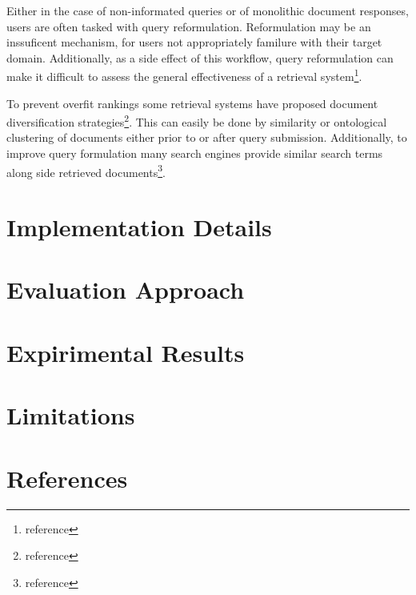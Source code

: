 \documentclass[10pt,twocolumn]{article} %
\begin{document}
Either in the case of non-informated queries or of monolithic document responses, users
are often tasked with query reformulation. Reformulation may be an inssuficent mechanism,
for users not appropriately familure with their target domain. Additionally, as
a side effect of this workflow, query reformulation can make it difficult to assess
the general effectiveness of a retrieval system\footnote{reference}.

To prevent overfit rankings some retrieval systems have proposed document diversification
strategies\footnote{reference}. This can easily be done by similarity or ontological
clustering of documents either prior to or after query submission. Additionally, to improve
query formulation many search engines provide similar search terms along side retrieved
documents\footnote{reference}.








\section{Implementation Details}
\section{Evaluation Approach}
\section{Expirimental Results}
\section{Limitations}
\section{References}
\end{document}
